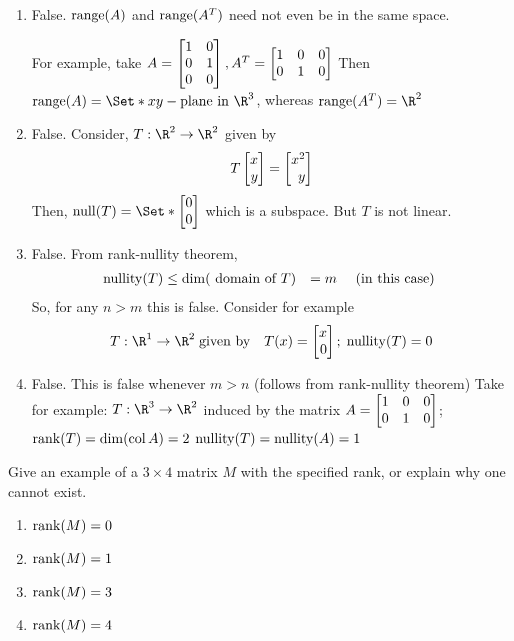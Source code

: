 \begin{exercises}
\begin{problist}
		\begin{solution}

			\begin{enumerate}
				\item False. $\operatorname{range}(A)$ and $\operatorname{range}(A^{T})$ need not even
					be in the same space.

					For example, take $A=\mat{1&0\\0&1\\0&0}, A^{T}=\mat{1&0&0\\0&1&0}$
					Then $\Range(A)=\Set*{xy-\text{plane in }\R^3}$,
					whereas $\Range(A^{T})=\R^{2}$

				\item False. Consider, $T:\R^{2}\to\R^{2}$ given by
					\[
						T\mat{x\\y}=\mat{x^2\\y}
					\]
					 Then, $\Null(T)= \Set*{\mat{0\\0}}$ which is a subspace.
					But $T$ is not linear.

				\item False. From rank-nullity theorem,
					\begin{align*}
						\operatorname{nullity}(T) & \leq \operatorname{dim}(\text{ domain of }T) & =m \quad \text{ (in this case) }
					\end{align*}So, for any $n>m$ this is false. Consider
					for example
					\begin{align*}
						 & T:\R^{1}\to\R^{2}\;\text{given by} & T(x)=\mat{x\\0};\; \Nullity(T)=0
					\end{align*}

				\item False. This is false whenever $m>n$ (follows from rank-nullity
					theorem) Take for example: $T:\R^{3}\to\R^{2}$ induced
					by the matrix $A=\mat{1&0&0\\0&1&0}$;\\ $\operatorname{rank}(T)=\operatorname{dim}(\operatorname{col}
					A)=2$ $\operatorname{nullity}(T) = \operatorname{nullity}(A)=1$
			\end{enumerate}
		\end{solution}

		\prob Give an example of a $3\times4$ matrix $M$ with the specified rank, or explain why one cannot exist.
		\begin{enumerate}
			\item $\operatorname{rank}(M) = 0$
			\item $\operatorname{rank}(M) = 1$
			\item $\operatorname{rank}(M) = 3$
			\item $\operatorname{rank}(M) = 4$
		\end{enumerate}


\end{problist}
\end{exercises}
